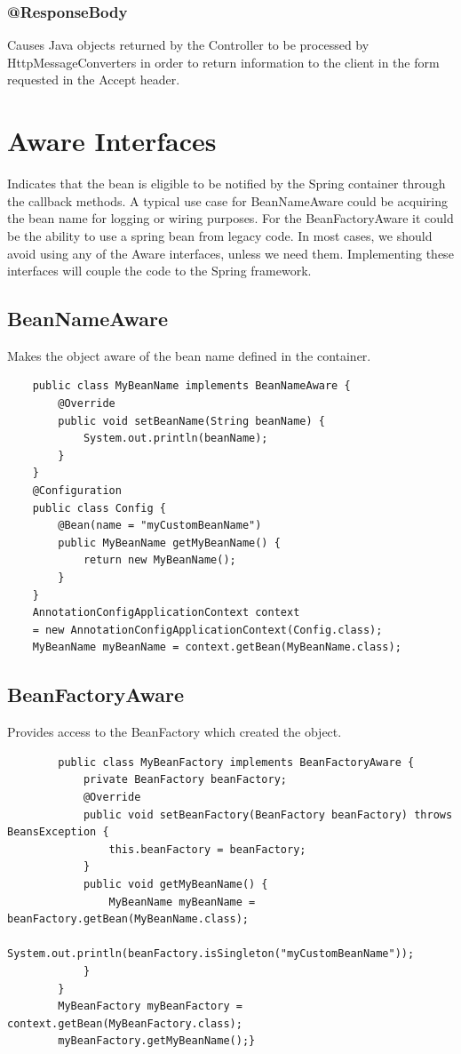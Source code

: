 \documentclass{scrartcl}
\begin{document}
\subsubsection{@ResponseBody}

Causes Java objects returned by the Controller to be processed by HttpMessageConverters in order to return information to the client in the form requested in the Accept header.

\section{Aware Interfaces}

    Indicates that the bean is eligible to be notified by the Spring container through the callback methods.
    A typical use case for BeanNameAware could be acquiring the bean name for logging or wiring purposes. For the BeanFactoryAware it could be the ability to use a spring bean from legacy code.
    In most cases, we should avoid using any of the Aware interfaces, unless we need them. Implementing these interfaces will couple the code to the Spring framework.

\subsection{BeanNameAware}

    Makes the object aware of the bean name defined in the container.

\begin{lstlisting}
    public class MyBeanName implements BeanNameAware {
        @Override
        public void setBeanName(String beanName) {
            System.out.println(beanName);
        }
    }
    @Configuration
    public class Config {
        @Bean(name = "myCustomBeanName")
        public MyBeanName getMyBeanName() {
            return new MyBeanName();
        }
    }
    AnnotationConfigApplicationContext context
    = new AnnotationConfigApplicationContext(Config.class);
    MyBeanName myBeanName = context.getBean(MyBeanName.class);

\end{lstlisting}

\subsection{BeanFactoryAware}

    Provides access to the BeanFactory which created the object.

    \begin{lstlisting}
        public class MyBeanFactory implements BeanFactoryAware {
            private BeanFactory beanFactory;
            @Override
            public void setBeanFactory(BeanFactory beanFactory) throws BeansException {
                this.beanFactory = beanFactory;
            }
            public void getMyBeanName() {
                MyBeanName myBeanName = beanFactory.getBean(MyBeanName.class);
                System.out.println(beanFactory.isSingleton("myCustomBeanName"));
            }
        }
        MyBeanFactory myBeanFactory = context.getBean(MyBeanFactory.class);
        myBeanFactory.getMyBeanName();}
    \end{lstlisting}
\end{document}
